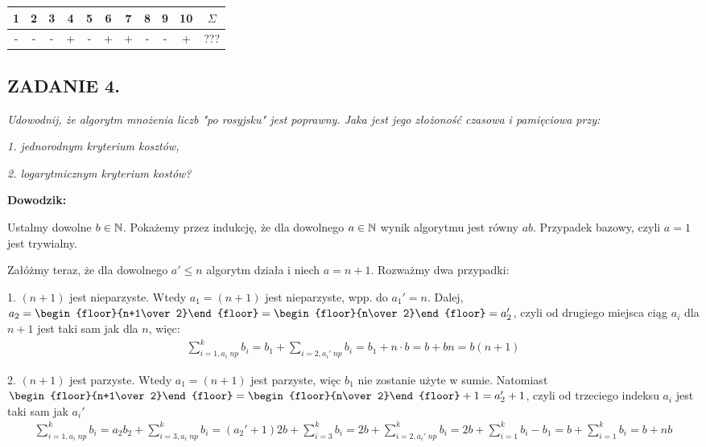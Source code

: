 \documentclass{article}
\begin{document}
\begin{center}\begin{tabular}{| c | c | c | c | c | c | c | c | c | c | c |}
    \hline

    1 & 2 & 3 & 4 & 5 & 6 & 7 & 8 & 9 & 10 & $\Sigma$\\

    \hline

    - & - & - & + & - & + & + & - & - & + & ???\\

    \hline
\end{tabular}\end{center}

\subsection*{ZADANIE 4.}
\emph{Udowodnij, że algorytm mnożenia liczb "po rosyjsku" jest poprawny. Jaka jest jego złożoność czasowa i pamięciowa przy:}

\emph{1. jednorodnym kryterium kosztów,}

\emph{2. logarytmicznym kryterium kostów?}
\medskip

\textbf{Dowodzik:}

Ustalmy dowolne $b\in\mathbb{N}$. Pokażemy przez indukcję, że dla dowolnego $a\in\mathbb{N}$ wynik algorytmu jest równy $ab$. Przypadek bazowy, czyli $a=1$ jest trywialny. 

Załóżmy teraz, że dla dowolnego $a'\leq n$ algorytm działa i niech $a=n+1$. Rozważmy dwa przypadki:

1. $(n+1)$ jest nieparzyste. Wtedy $a_1=(n+1)$ jest nieparzyste, wpp. do $a_1'=n$. Dalej, $a_2=\begin{floor}{n+1\over 2}\end{floor}=\begin{floor}{n\over 2}\end{floor}=a_2'$, czyli od drugiego miejsca ciąg $a_i$ dla $n+1$ jest taki sam jak dla $n$, więc:
\begin{align*}
    \sum\limits_{i=1,a_i \;np}^kb_i=b_1+\sum\limits_{i=2,a_i'\; np} b_i=b_1+n\cdot b=b+bn=b(n+1)
\end{align*}

2. $(n+1)$ jest parzyste. Wtedy $a_1=(n+1)$ jest parzyste, więc $b_1$ nie zostanie użyte w sumie. Natomiast $\begin{floor}{n+1\over 2}\end{floor}=\begin{floor}{n\over 2}\end{floor}+1=a_2'+1$, czyli od trzeciego indeksu $a_i$ jest taki sam jak $a_i'$
\begin{align*}
    \sum\limits_{i=1, a_i \;np}^kb_i=a_2b_2+\sum\limits_{i=3,a_i\;np}^kb_i=(a_2'+1)2b+\sum\limits_{i=3}^k b_i=2b+\sum\limits_{i=2,a_i'\;np}^kb_i=2b+\sum\limits_{i=1}^kb_i-b_1=b+\sum\limits_{i=1}^kb_i=b+nb
\end{align*}
\end{document}
